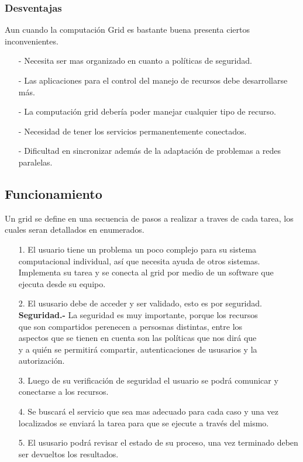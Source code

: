 \documentclass[12pt]{article}
\begin{document}
{{\subsubsection{Desventajas}
Aun cuando la computaci\'on Grid es bastante buena presenta ciertos inconvenientes.
\begin{itemize}
\item[-]Necesita ser mas organizado en cuanto a pol\'iticas de seguridad.
\item[-]Las aplicaciones para el control del manejo de recursos debe desarrollarse m\'as.
\item[-]La computaci\'on grid deber\'ia poder manejar cualquier tipo de recurso.
\item[-]Necesidad de tener los servicios permanentemente conectados.
\item[-]Dificultad en sincronizar adem\'as de la adaptaci\'on de problemas a redes paralelas.
\end{itemize}
}

\newpage
{\raggedright
\subsection{Funcionamiento}
Un grid se define en una secuencia de pasos a realizar a traves de cada tarea, los cuales seran detallados en enumerados.
\begin{itemize}
\item[1.]El usuario tiene un problema un poco complejo para su sistema computacional individual, as\'i que necesita ayuda de otros sistemas. Implementa su tarea y se conecta al grid por medio de un software que ejecuta desde su equipo.
\item[2.]El ususario debe de acceder y ser validado, esto es por seguridad.\vspace{0.1in}\\\hspace{0.2in}
\textbf{Seguridad.-} La seguridad es muy importante, porque los recursos \\\hspace{0.3in}que son compartidos perenecen a persosnas distintas, entre los \\\hspace{0.3in}aspectos que se tienen en cuenta son las pol\'iticas que nos dir\'a que \\\hspace{0.3in}y a qui\'en se permitir\'a compartir, autenticaciones de ususarios y la \\\hspace{0.3in}autorizaci\'on.
\item[3.]Luego de su verificaci\'on de seguridad el usuario se podr\'a comunicar y conectarse a los recursos.
\item[4.]Se buscar\'a el servicio que sea mas adecuado para cada caso y una vez localizados se enviar\'a la tarea para que se ejecute a trav\'es del mismo.
\item[5.]El ususario podr\'a revisar el estado de su proceso, una vez terminado deben ser devueltos los resultados.
\end{itemize}
}


}
\end{document}
